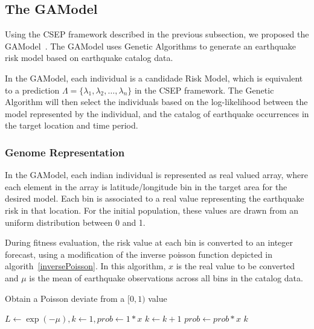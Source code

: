 \subsection{The GAModel}\label{sec:background:gamodel}

Using the CSEP framework described in the previous subsection, we
proposed the GAModel~\cite{ecta14}. The GAModel uses Genetic
Algorithms to generate an earthquake risk model based on earthquake
catalog data.

In the GAModel, each individual is a candidade Risk Model, which is
equivalent to a prediction $\Lambda = \{\lambda_1, \lambda_2, \ldots,
\lambda_n\}$ in the CSEP framework. The Genetic Algorithm will then
select the individuals based on the log-likelihood between the model
represented by the individual, and the catalog of earthquake
occurrences in the target location and time period.

\subsubsection*{Genome Representation}

In the GAModel, each indian individual is represented as real valued
array, where each element in the array is latitude/longitude bin in
the target area for the desired model. Each bin is associated to a
real value representing the earthquake risk in that location. For the
initial population, these values are drawn from an uniform
distribution between 0 and 1.


During fitness evaluation, the risk value at each bin is converted to
an integer forecast, using a modification of the inverse poisson
function depicted in algorith~\ref{inversePoisson}. In this algorithm,
$x$ is the real value to be converted and $\mu$ is the mean of
earthquake observations across all bins in the catalog data.

\begin{algorithm}[H]\label{inversePoisson}
  \caption{Obtain a Poisson deviate from a $[0,1)$ value}
    \label{inversePoisson}
    \begin{algorithmic}
      \STATE $L \gets \exp{(-\mu)}, k \gets 1, prob \gets 1 * x$
      \STATE $k \gets k + 1$
      \STATE $prob \gets prob*x$
      \ENDWHILE
      \RETURN $k$
    \end{algorithmic}
\end{algorithm}

